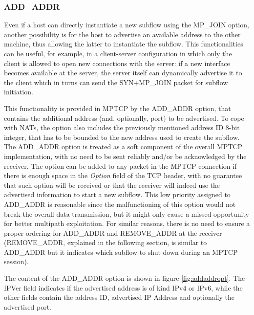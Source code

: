 
\subsubsection{ADD\_ADDR}
Even if a host can directly instantiate a new subflow using the MP\_JOIN option, another possibility is for the host to advertise an available address to the other machine, thus allowing the latter to instantiate the subflow.
This functionalities can be useful, for example, in a client-server configuration in which only the client is allowed to open new connections with the server: if a new interface becomes available at the server, the server itself can dynamically advertise it to the client which in turns can send the SYN+MP\_JOIN packet for subflow initiation.

This functionality is provided in MPTCP by the ADD\_ADDR option, that contains the additional address (and, optionally, port) to be advertised. To cope with NATs, the option also includes the previously mentioned address ID 8-bit integer, that has to be bounded to the new address used to create the subflow.
The ADD\_ADDR option is treated as a soft component of the overall MPTCP implementation, with no need to be sent reliably and/or be acknowledged by the receiver. The option can be added to any packet in the MPTCP connection if there is enough space in the \textit{Option} field of the TCP header, with no guarantee that such option will be received or that the receiver will indeed use the advertised information to start a new subflow. This low priority assigned to ADD\_ADDR is reasonable since the malfunctioning of this option would not break the overall data transmission, but it might only cause a missed opportunity for better multipath exploitation. For similar reasons, there is no need to ensure a proper ordering for ADD\_ADDR and REMOVE\_ADDR at the receiver (REMOVE\_ADDR, explained in the following section, is similar to ADD\_ADDR but it indicates which subflow to shut down during an MPTCP session). 

The content of the ADD\_ADDR option is shown in figure \ref{fig:addaddropt}. The IPVer field indicates if the advertised address is of kind IPv4 or IPv6, while the other fields contain the address ID, advertised IP Address and optionally the advertised port.

